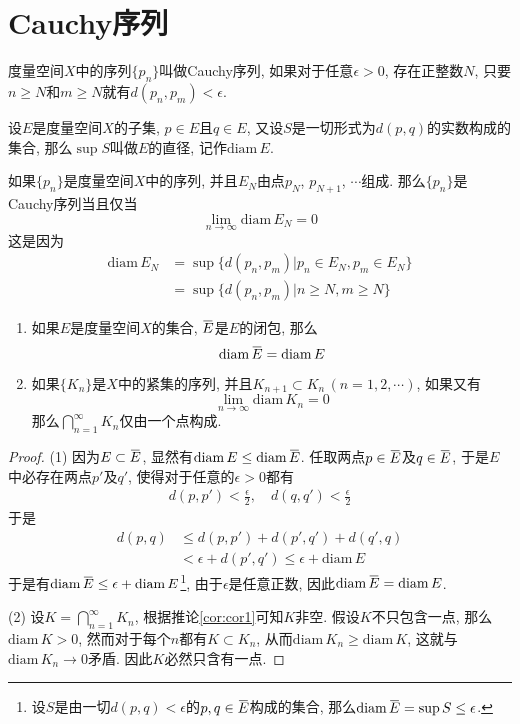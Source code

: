 \documentclass[cn,12pt,math=mtpro2,citestyle=gb7714-2015,bibstyle=gb7714-2015,twocol]{elegantbook}
\newcommand{\diam}{\text{diam}\,}
\newcommand{\limn}{\lim_{n\to\infty}}
\newcommand{\overbar}[1]{\mkern 1.5mu\overline{\mkern-1.5mu#1\mkern-1.5mu}\mkern 1.5mu}
\begin{document}
\section{Cauchy序列}
\begin{definition}
度量空间$X$中的序列$\{p_n\}$叫做Cauchy序列, 如果对于任意$\epsilon>0$, 存在正整数$N$, 只要$n\geq N$和$m\geq N$就有$d(p_n,p_m)<\epsilon$.
\end{definition}
\begin{definition}
设$E$是度量空间$X$的子集, $p\in E$且$q\in E$, 又设$S$是一切形式为$d(p,q)$的实数构成的集合, 那么$\sup S$叫做$E$的直径, 记作$\diam E$.
\end{definition}
如果$\{p_n\}$是度量空间$X$中的序列, 并且$E_N$由点$p_N$, $p_{N+1}$, $\cdots$组成. 那么$\{p_n\}$是Cauchy序列当且仅当
$$\limn \diam E_N=0$$
这是因为
\begin{align*}
\diam E_N&=\sup\{d(p_n,p_m)|p_n\in E_N, p_m\in E_N\} \\
&=\sup\{d(p_n,p_m)|n\geq N, m\geq N\}
\end{align*}
\begin{theorem}\label{thm:th3.3}
   \begin{enumerate}[label=(\arabic*)]
  \item 如果$E$是度量空间$X$的集合, $\overbar{E}$是$E$的闭包, 那么
  $$\diam\overbar{E}=\diam E$$

  \item 如果$\{K_n\}$是$X$中的紧集的序列, 并且$K_{n+1}\subset K_n\,(n=1,2,\cdots)$, 如果又有
  $$\limn \diam K_n=0$$
  那么$\bigcap_{n=1}^\infty K_n$仅由一个点构成.
  \end{enumerate}
\end{theorem}
\begin{proof}
  (1) 因为$E\subset \overbar{E}$, 显然有$\diam E\leq\diam\overbar{E}$. 任取两点$p\in\overbar{E}$及$q\in\overbar{E}$, 于是$E$中必存在两点$p'$及$q'$, 使得对于任意的$\epsilon>0$都有
  \begin{align*}
  d(p,p')<\frac{\epsilon}{2},\quad d(q,q')<\frac{\epsilon}{2}
  \end{align*}
  于是
  \begin{align*}
  d(p,q)&\leq d(p,p')+d(p',q')+d(q',q) \\
  &<\epsilon+d(p',q')\leq \epsilon+\diam E
  \end{align*}
  于是有$\diam\overbar{E}\leq \epsilon+\diam E$\footnote{设$S$是由一切$d(p,q)<\epsilon$的$p, q\in \overbar{E}$构成的集合, 那么$\diam \overbar{E}=\sup S\leq \epsilon$.}, 由于$\epsilon$是任意正数, 因此$\diam\overbar{E}=\diam E$.

  (2) 设$K= \bigcap_{n=1}^\infty K_n$, 根据推论\ref{cor:cor1}可知$K$非空. 假设$K$不只包含一点, 那么$\diam K>0$, 然而对于每个$n$都有$K\subset K_n$, 从而$\diam K_n\geq\diam K$, 这就与$\diam K_n\rightarrow 0$矛盾. 因此$K$必然只含有一点.
\end{proof}
\end{document}
